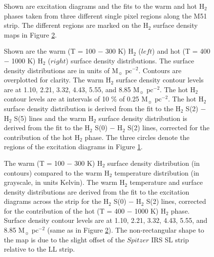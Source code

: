 \documentclass[manuscript]{aastex}
\begin{document}
\clearpage

\begin{figure}
\caption{Shown are excitation diagrams and the fits to the warm
and hot H$_2$ phases taken from three different single pixel regions along the M51 strip. 
The different regions are marked on the H$_2$ surface density maps 
in Figure \ref{figure-4}.}
\label{figure-3}
\end{figure}

\clearpage

\begin{figure}
\caption{Shown are the warm (T = 100 $-$ 300 K) 
H$_2$ ($left$) and hot (T = 400 $-$ 1000 K) 
H$_2$ ($right$) surface density distributions.  The surface density
 distributions are in units of $\mathrm{M_\sun}$ 
$\mathrm{pc^{-2}}$.   Contours are overplotted for clarity.  
The warm H$_2$ surface density contour levels are at 
1.10, 2.21, 3.32, 4.43, 5.55, and 8.85 $\mathrm{M_\sun}$ $\mathrm{pc^{-2}}$.  
The hot H$_2$ contour 
levels are at intervals of 10 \% of 0.25 $\mathrm{M_\sun}$ $\mathrm{pc^{-2}}$.  
The hot H$_2$ surface density distribution is derived 
from the fit to the H$_2$ S(2) $-$ 
H$_2$ S(5) lines and the warm H$_2$ 
surface density distribution is derived from the fit to the 
H$_2$ S(0) $-$ H$_2$ S(2) lines, 
corrected for the contribution of the hot H$_2$ phase.
The three circles denote the regions of the excitation diagrams in Figure \ref{figure-3}.}
\label{figure-4}
\end{figure}

\clearpage

\begin{figure}
\caption{The warm (T = 100 $-$ 300 K) H$_2$ surface 
density distribution (in contours) compared 
to the warm H$_2$ temperature distribution 
(in grayscale, in units Kelvin).  The warm H$_2$ 
temperature and surface density distributions are derived from the fit to the excitation 
diagrams across the strip for the H$_2$ S(0) $-$ H$_2$ S(2) lines, 
corrected for the contribution of the hot (T = 400 $-$ 1000 K) H$_2$ phase.  
Surface density contour levels are at 
1.10, 2.21, 3.32, 4.43, 5.55, and 8.85 $\mathrm{M_\sun}$ $\mathrm{pc^{-2}}$ 
(same as in Figure \ref{figure-4}). The non-rectangular shape to the 
map is due to the slight offset of the $Spitzer$ IRS SL 
strip relative to the LL strip.}
\label{figure-5}
\end{figure}
\end{document}
